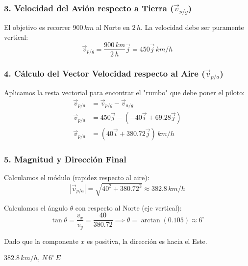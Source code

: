 \documentclass[12pt, a4paper]{article}
\begin{document}
\subsubsection*{3. Velocidad del Avión respecto a Tierra ($\vec{v}_{p/g}$)}

El objetivo es recorrer $900 \, \si{km}$ al Norte en $2 \, \si{h}$. La velocidad debe ser puramente vertical:
\begin{equation}
    \vec{v}_{p/g} = \frac{900 \, \si{km}}{2 \, \si{h}} \vec{j} = 450 \vec{j} \, \si{km/h}
\end{equation}

\subsubsection*{4. Cálculo del Vector Velocidad respecto al Aire ($\vec{v}_{p/a}$)}

Aplicamos la resta vectorial para encontrar el "rumbo" que debe poner el piloto:
\begin{align*}
    \vec{v}_{p/a} &= \vec{v}_{p/g} - \vec{v}_{a/g} \\
    \vec{v}_{p/a} &= 450 \vec{j} - (-40 \vec{i} + 69.28 \vec{j}) \\
    \vec{v}_{p/a} &= (40 \vec{i} + 380.72 \vec{j}) \, \si{km/h}
\end{align*}

\subsubsection*{5. Magnitud y Dirección Final}

Calculamos el módulo (rapidez respecto al aire):
\begin{equation}
    |\vec{v}_{p/a}| = \sqrt{40^2 + 380.72^2} \approx 382.8 \, \si{km/h}
\end{equation}

Calculamos el ángulo $\theta$ con respecto al Norte (eje vertical):
\begin{equation}
    \tan \theta = \frac{v_x}{v_y} = \frac{40}{380.72} \implies \theta = \arctan(0.105) \approx 6^\circ
\end{equation}

Dado que la componente $x$ es positiva, la dirección es hacia el Este.

\begin{tcolorbox}[colback=green!5!white, colframe=green!50!black, title=Respuesta Final]
\centering
\Large $382.8 \, \si{km/h}, \, N \, 6^\circ \, E$
\end{tcolorbox}
\end{document}
